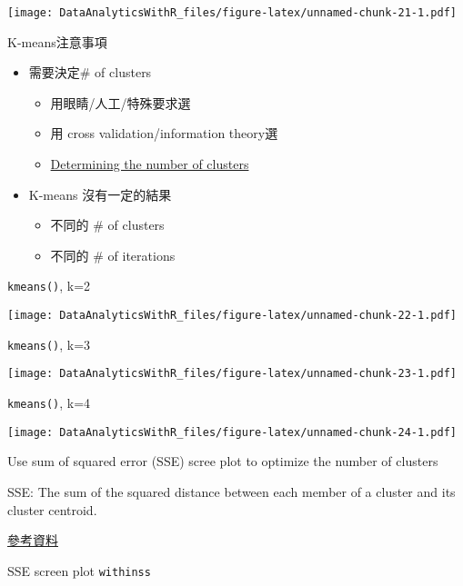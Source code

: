 \documentclass[]{book}
\providecommand{\tightlist}{%
  \setlength{\itemsep}{0pt}\setlength{\parskip}{0pt}}
\begin{document}
\texttt{[image: DataAnalyticsWithR\_files/figure-latex/unnamed-chunk-21-1.pdf]}

K-means注意事項

\begin{itemize}
\tightlist
\item
  需要決定\# of clusters

  \begin{itemize}
  \tightlist
  \item
    用眼睛/人工/特殊要求選
  \item
    用 cross validation/information theory選
  \item
    \href{http://en.wikipedia.org/wiki/Determining_the_number_of_clusters_in_a_data_set}{Determining
    the number of clusters}
  \end{itemize}
\item
  K-means 沒有一定的結果

  \begin{itemize}
  \tightlist
  \item
    不同的 \# of clusters
  \item
    不同的 \# of iterations
  \end{itemize}
\end{itemize}

\texttt{kmeans()}, k=2

\texttt{[image: DataAnalyticsWithR\_files/figure-latex/unnamed-chunk-22-1.pdf]}

\texttt{kmeans()}, k=3

\texttt{[image: DataAnalyticsWithR\_files/figure-latex/unnamed-chunk-23-1.pdf]}

\texttt{kmeans()}, k=4

\texttt{[image: DataAnalyticsWithR\_files/figure-latex/unnamed-chunk-24-1.pdf]}

Use sum of squared error (SSE) scree plot to optimize the number of
clusters

SSE: The sum of the squared distance between each member of a cluster
and its cluster centroid.

\href{http://stackoverflow.com/questions/15376075/cluster-analysis-in-r-determine-the-optimal-number-of-clusters}{參考資料}

SSE screen plot \texttt{withinss}
\end{document}
